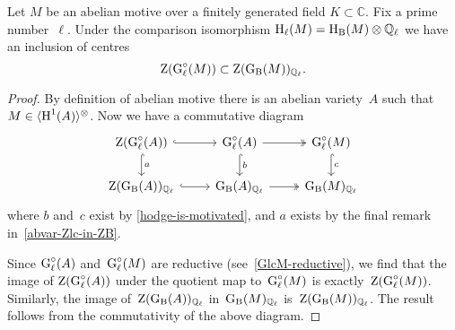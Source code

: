 \documentclass[10pt,twoside,leqno]{article}
\numberwithin{equation}{subsection}
\newcommand{\onto}{\twoheadrightarrow}
\newcommand{\End}{\textnormal{End}}
\newcommand{\QQ}{\mathbb{Q}}
\newcommand{\QQl}{\QQ_{\ell}}
\newcommand{\CC}{\mathbb{C}}
\newcommand{\Vect}{\textnormal{Vect}}
\newcommand{\HH}{\textnormal{H}}
\newcommand{\Hl}{\HH_{\ell}}
\newcommand{\HB}{\HH_{\textnormal{B}}}
\newcommand{\Zentrum}{\textnormal{Z}}
\newcommand{\GG}{\textnormal{G}}
\newcommand{\GB}{\GG_{\textnormal{B}}}
\newcommand{\Gl}{\GG_{\ell}}
\newcommand{\Glc}{\Gl^{\circ}}
\newcommand{\Tangen}[1]{\langle #1 \rangle^{\otimes}}
\begin{document}
\begin{remark} %
\end{remark}

\begin{lemma} %
 \label{abelian-motive-centre-inclusion}
 Let $M$ be an abelian motive over
 a finitely generated field $K \subset \CC$.
 Fix a prime number~$\ell$.
 Under the comparison isomorphism $\Hl(M) = \HB(M) \otimes \QQl$
 we have an inclusion of centres
 \[
  \Zentrum(\Glc(M)) \subset \Zentrum(\GB(M))_{\QQl}.
 \]
 \begin{proof}
  By definition of abelian motive there is an abelian variety~$A$
  such that $M \in \Tangen{\HH^1(A)}$.
  Now we have a commutative diagram
  \[
   \begin{tikzcd}
    \Zentrum(\Glc(A)) \ar[r,hook] \ar[d,hook,"a"] &
    \Glc(A) \ar[r,two heads] \ar[d,hook,"b"] &
    \Glc(M) \ar[d,hook,"c"] \\
    \Zentrum(\GB(A))_{\QQl} \ar[r,hook] &
    \GB(A)_{\QQl} \ar[r,two heads] &
    \GB(M)_{\QQl}
   \end{tikzcd}
  \]
  where $b$ and~$c$ exist by \cref{hodge-is-motivated},
  and $a$ exists by the final remark in~\cref{abvar-Zlc-in-ZB}.

  Since $\Glc(A)$ and~$\Glc(M)$ are reductive (see~\cref{GlcM-reductive}),
  we find that the image of $\Zentrum(\Glc(A))$
  under the quotient map to~$\Glc(M)$
  is exactly~$\Zentrum(\Glc(M))$.
  Similarly,
  the image of~$\Zentrum(\GB(A))_{\QQl}$ in~$\GB(M)_{\QQl}$
  is~$\Zentrum(\GB(M))_{\QQl}$.
  The result follows from the commutativity of the above diagram.
 \end{proof}
\end{lemma}
\end{document}

